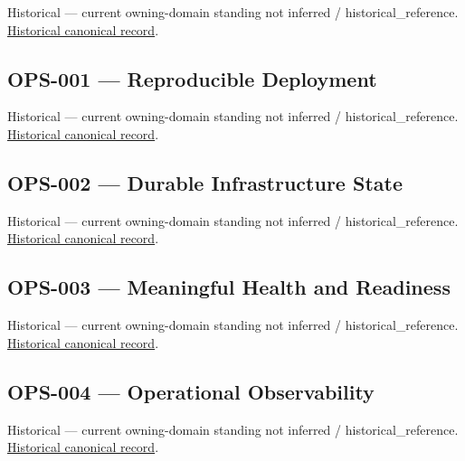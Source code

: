 \par\label{element:6fe86be142044e5aa7720e2e6493a72a}
Historical — current owning-domain standing not inferred / historical\_reference. \href{../../../../continuum/motivation/requirement/6fe86be142044e5aa7720e2e6493a72a.md}{Historical canonical record}.\par

\subsection{OPS-001 — Reproducible Deployment}

\par\label{element:c4373b1fd8444f10b502a5c3216152d7}
Historical — current owning-domain standing not inferred / historical\_reference. \href{../../../../continuum/motivation/requirement/c4373b1fd8444f10b502a5c3216152d7.md}{Historical canonical record}.\par

\subsection{OPS-002 — Durable Infrastructure State}

\par\label{element:d5d6a9ea450047b1bd62b13177e8fca6}
Historical — current owning-domain standing not inferred / historical\_reference. \href{../../../../continuum/motivation/requirement/d5d6a9ea450047b1bd62b13177e8fca6.md}{Historical canonical record}.\par

\subsection{OPS-003 — Meaningful Health and Readiness}

\par\label{element:4c02fec3af264b878ee3e0cfaecbf55f}
Historical — current owning-domain standing not inferred / historical\_reference. \href{../../../../continuum/motivation/requirement/4c02fec3af264b878ee3e0cfaecbf55f.md}{Historical canonical record}.\par

\subsection{OPS-004 — Operational Observability}

\par\label{element:b5d3447a05b249a8af154136fc36c4d9}
Historical — current owning-domain standing not inferred / historical\_reference. \href{../../../../continuum/motivation/requirement/b5d3447a05b249a8af154136fc36c4d9.md}{Historical canonical record}.\par

